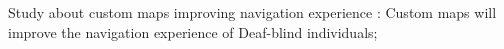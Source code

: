 Study about custom maps improving navigation experience : Custom maps will improve the navigation experience of Deaf-blind individuals;
